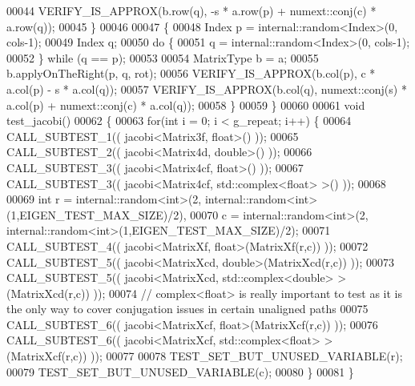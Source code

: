 \begin{DoxyCode}
00044     VERIFY\_IS\_APPROX(b.row(q), -s * a.row(p) + numext::conj(c) * a.row(q));
00045   \}
00046 
00047   \{
00048     Index p = internal::random<Index>(0, cols-1);
00049     Index q;
00050     \textcolor{keywordflow}{do} \{
00051       q = internal::random<Index>(0, cols-1);
00052     \} \textcolor{keywordflow}{while} (q == p);
00053 
00054     MatrixType b = a;
00055     b.applyOnTheRight(p, q, rot);
00056     VERIFY\_IS\_APPROX(b.col(p), c * a.col(p) - s * a.col(q));
00057     VERIFY\_IS\_APPROX(b.col(q), numext::conj(s) * a.col(p) + numext::conj(c) * a.col(q));
00058   \}
00059 \}
00060 
00061 \textcolor{keywordtype}{void} test\_jacobi()
00062 \{
00063   \textcolor{keywordflow}{for}(\textcolor{keywordtype}{int} i = 0; i < g\_repeat; i++) \{
00064     CALL\_SUBTEST\_1(( jacobi<Matrix3f, float>() ));
00065     CALL\_SUBTEST\_2(( jacobi<Matrix4d, double>() ));
00066     CALL\_SUBTEST\_3(( jacobi<Matrix4cf, float>() ));
00067     CALL\_SUBTEST\_3(( jacobi<Matrix4cf, std::complex<float> >() ));
00068 
00069     \textcolor{keywordtype}{int} r = internal::random<int>(2, internal::random<int>(1,EIGEN\_TEST\_MAX\_SIZE)/2),
00070         c = internal::random<int>(2, internal::random<int>(1,EIGEN\_TEST\_MAX\_SIZE)/2);
00071     CALL\_SUBTEST\_4(( jacobi<MatrixXf, float>(MatrixXf(r,c)) ));
00072     CALL\_SUBTEST\_5(( jacobi<MatrixXcd, double>(MatrixXcd(r,c)) ));
00073     CALL\_SUBTEST\_5(( jacobi<MatrixXcd, std::complex<double> >(MatrixXcd(r,c)) ));
00074     \textcolor{comment}{// complex<float> is really important to test as it is the only way to cover conjugation issues in
       certain unaligned paths}
00075     CALL\_SUBTEST\_6(( jacobi<MatrixXcf, float>(MatrixXcf(r,c)) ));
00076     CALL\_SUBTEST\_6(( jacobi<MatrixXcf, std::complex<float> >(MatrixXcf(r,c)) ));
00077     
00078     TEST\_SET\_BUT\_UNUSED\_VARIABLE(r);
00079     TEST\_SET\_BUT\_UNUSED\_VARIABLE(c);
00080   \}
00081 \}
\end{DoxyCode}
